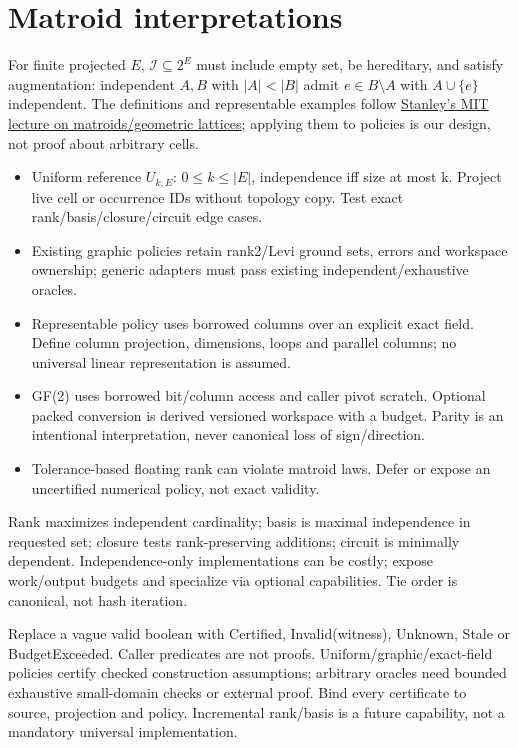 \documentclass[10pt,a4paper]{article}
\begin{document}
\section{Matroid interpretations}
\label{sec:matroid}
For finite projected $E$, $\mathcal I\subseteq2^E$ must include empty set, be hereditary, and satisfy augmentation: independent $A,B$ with $|A|<|B|$ admit $e\in B\setminus A$ with $A\cup\{e\}$ independent. The definitions and representable examples follow \href{https://ocw.mit.edu/courses/18-315-combinatorial-theory-hyperplane-arrangements-fall-2004/4b5dc2db132d782df7a9a5ca665c94da_lec3.pdf}{Stanley's MIT lecture on matroids/geometric lattices}; applying them to policies is our design, not proof about arbitrary cells.
\begin{itemize}
\item Uniform reference $U_{k,E}$: $0\leq k\leq|E|$, independence iff size at most k. Project live cell or occurrence IDs without topology copy. Test exact rank/basis/closure/circuit edge cases.
\item Existing graphic policies retain rank2/Levi ground sets, errors and workspace ownership; generic adapters must pass existing independent/exhaustive oracles.
\item Representable policy uses borrowed columns over an explicit exact field. Define column projection, dimensions, loops and parallel columns; no universal linear representation is assumed.
\item GF(2) uses borrowed bit/column access and caller pivot scratch. Optional packed conversion is derived versioned workspace with a budget. Parity is an intentional interpretation, never canonical loss of sign/direction.
\item Tolerance-based floating rank can violate matroid laws. Defer or expose an uncertified numerical policy, not exact validity.
\end{itemize}
Rank maximizes independent cardinality; basis is maximal independence in requested set; closure tests rank-preserving additions; circuit is minimally dependent. Independence-only implementations can be costly; expose work/output budgets and specialize via optional capabilities. Tie order is canonical, not hash iteration.

Replace a vague valid boolean with Certified, Invalid(witness), Unknown, Stale or BudgetExceeded. Caller predicates are not proofs. Uniform/graphic/exact-field policies certify checked construction assumptions; arbitrary oracles need bounded exhaustive small-domain checks or external proof. Bind every certificate to source, projection and policy. Incremental rank/basis is a future capability, not a mandatory universal implementation.
\end{document}
